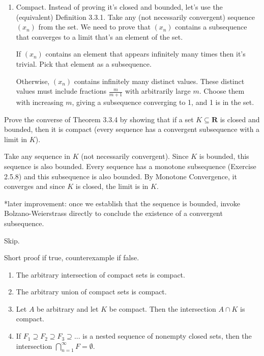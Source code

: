 \documentclass{oxmathproblems}
\begin{document}
\begin{questions}
\begin{solution}
\begin{enumerate}[label=(\alph*)]
    \item Compact. Instead of proving it's closed and bounded, let's use the (equivalent) Definition 3.3.1. Take any (not necessarily convergent) sequence $(x_{n})$
    from the set. We need to prove that $(x_{n})$ contains a subsequence that converges to a limit that's an element of the set.

    If $(x_{n})$ contains an element that appears infinitely many times then it's trivial. Pick that element as a subsequence.
    
    Otherwise, $(x_{n})$ contains infinitely many distinct values. These distinct values must include fractions $\frac{m}{m+1}$ with arbitrarily large $m$.
    Choose them with increasing $m$, giving a subsequence converging to 1, and 1 is in the set.
  \end{enumerate}
\end{solution}

\miquestion Prove the converse of Theorem 3.3.4 by showing that if a set $K \subseteq \textbf{R}$ is closed and bounded, then it is compact (every sequence has a convergent
subsequence with a limit in $K$).

\begin{solution}
  Take any sequence in $K$ (not necessarily convergent). Since $K$ is bounded, this sequence is also bounded. Every sequence has a monotone subsequence
  (Exercise 2.5.8) and this subsequence is also bounded. By Monotone Convergence, it converges and since $K$ is closed, the limit is in $K$.

  *later improvement: once we establish that the sequence is bounded, invoke Bolzano-Weierstrass directly to conclude the existence of a convergent subsequence.
\end{solution}

\miquestion Skip.

\miquestion Short proof if true, counterexample if false.
\begin{enumerate}[label=(\alph*)]
  \item The arbitrary intersection of compact sets is compact.
  \item The arbitrary union of compact sets is compact.
  \item Let $A$ be arbitrary and let $K$ be compact. Then the intersection $A \cap K$ is compact.
  \item If $F_{1} \supseteq F_{2} \supseteq F_{3} \supseteq ...$ is a nested sequence of nonempty closed sets, then the intersection $\bigcap_{n=1}^{\infty} F = \emptyset$.
\end{enumerate}


\end{questions}
\end{document}
